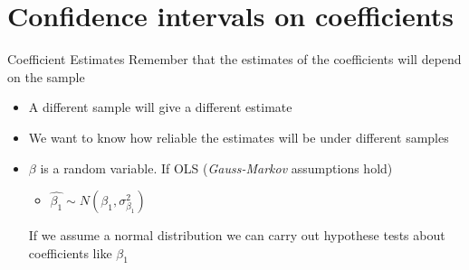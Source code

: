\documentclass[14pt,xcolor=pdftex,dvipsnames,table]{beamer}\usepackage[]{graphicx}\usepackage[]{color}
\begin{document}
\section{Confidence intervals on coefficients}
\begin{frame}{Coefficient Estimates}
Remember that the estimates of the coefficients will depend on the sample
\begin{itemize}[<+-| alert@+>]
\item A different sample will give a different estimate
\item We want to know how reliable the estimates will be under different samples
\item $\beta$ is a random variable.  If OLS (\emph{Gauss-Markov} assumptions hold)
\begin{itemize}
\item $\hat{\beta_1} \sim N (\beta_1, \sigma_{\beta_1}^2)$
\end{itemize}
\pause
If we assume a normal distribution we can carry out hypothese tests about coefficients like $\beta_1$
\end{itemize}
\end{frame}
\end{document}

